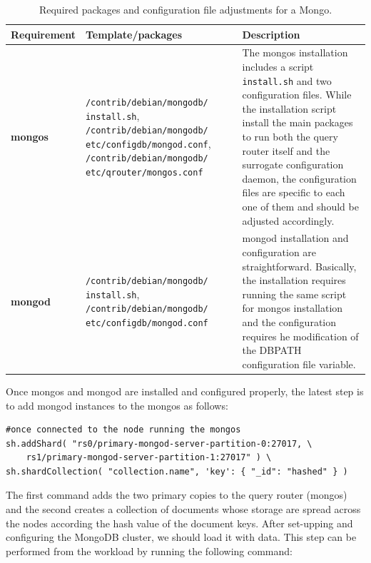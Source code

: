 			\begin{table}[htdp]
				\begin{center}
\caption{Required packages and configuration file adjustments for a Mongo.}
  \label{tab:common_install_conf}
					\begin{tabular}{R{2.5cm} || L{4.5cm} L{6cm} }
						{\bf Requirement}&{\bf Template/packages}&{\bf Description} \\  
						\hline
						\hline
						{\bf mongos}&\verb|/contrib/debian/mongodb/| \verb|install.sh|, \verb|/contrib/debian/mongodb/| \verb|etc/configdb/mongod.conf|, \verb|/contrib/debian/mongodb/| \verb|etc/qrouter/mongos.conf| & The mongos installation includes a script \verb|install.sh| and two configuration files. While the installation script install the main packages to run both the query router itself and the surrogate configuration daemon, the configuration files are specific to each one of them  and should be adjusted accordingly. \\
						\hline
						{\bf mongod}&\verb|/contrib/debian/mongodb/| \verb|install.sh|, \verb|/contrib/debian/mongodb/| \verb|etc/configdb/mongod.conf| & mongod installation and configuration are straightforward. Basically, the installation requires running the same script for mongos installation and the configuration requires he modification of the DBPATH configuration file variable.\\
					\end{tabular}
				\end{center}
			\end{table}

Once mongos and mongod are installed and configured properly, the latest step is to add mongod instances to the mongos as follows:

\begin{lstlisting}
#once connected to the node running the mongos
sh.addShard( "rs0/primary-mongod-server-partition-0:27017, \
    rs1/primary-mongod-server-partition-1:27017" ) \
sh.shardCollection( "collection.name", 'key': { "_id": "hashed" } ) 
\end{lstlisting}

The first command adds the two primary copies to the query router (mongos) and the second creates a collection of documents whose storage are spread across the nodes according the hash value of the document keys. After set-upping and configuring the MongoDB cluster, we should load it with data. This step can be performed from the workload by running the following command:

